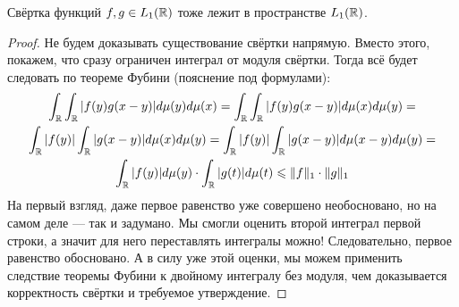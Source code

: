 \begin{proposition}
	Свёртка функций $f, g \in L_1(\mathbb{R})$ тоже лежит в пространстве $L_1(\mathbb{R})$.
\end{proposition}

\begin{proof}
	Не будем доказывать существование свёртки напрямую. Вместо этого, покажем, что сразу ограничен интеграл от модуля свёртки. Тогда всё будет следовать по теореме Фубини (пояснение под формулами):
	\begin{multline*}
		\int_{\mathbb{R}} \int_{\mathbb{R}} |f(y)g(x - y)|d\mu(y)d\mu(x) = \int_{\mathbb{R}} \int_{\mathbb{R}} |f(y)g(x - y)|d\mu(x)d\mu(y) =
		\\
		\int_{\mathbb{R}} |f(y)| \int_{\mathbb{R}} |g(x - y)|d\mu(x)d\mu(y) = \int_{\mathbb{R}} |f(y)| \int_{\mathbb{R}} |g(x - y)|d\mu(x - y)d\mu(y) =
		\\
		\int_{\mathbb{R}} |f(y)|d\mu(y) \cdot \int_{\mathbb{R}} |g(t)|d\mu(t) \leqslant \|f\|_1 \cdot \|g\|_1
	\end{multline*}
	На первый взгляд, даже первое равенство уже совершено необосновано, но на самом деле --- так и задумано. Мы смогли оценить второй интеграл первой строки, а значит для него переставлять интегралы можно! Следовательно, первое равенство обосновано. А в силу уже этой оценки, мы можем применить следствие теоремы Фубини к двойному интегралу без модуля, чем доказывается корректность свёртки и требуемое утверждение.
\end{proof}